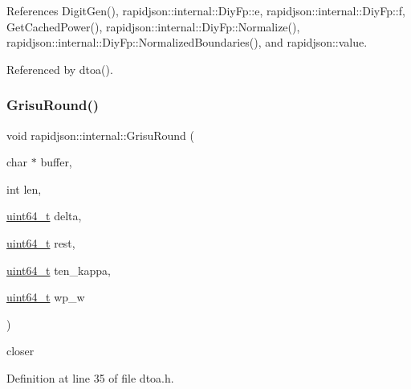 References Digit\+Gen(), rapidjson\+::internal\+::\+Diy\+Fp\+::e, rapidjson\+::internal\+::\+Diy\+Fp\+::f, Get\+Cached\+Power(), rapidjson\+::internal\+::\+Diy\+Fp\+::\+Normalize(), rapidjson\+::internal\+::\+Diy\+Fp\+::\+Normalized\+Boundaries(), and rapidjson\+::value.



Referenced by dtoa().

\mbox{\label{namespacerapidjson_1_1internal_a7d7397686d2c8c57cf11d9afae17bb4d}} 
\subsubsection{\texorpdfstring{GrisuRound()}{GrisuRound()}}
{\footnotesize\ttfamily void rapidjson\+::internal\+::\+Grisu\+Round (\begin{DoxyParamCaption}\item[{char $\ast$}]{buffer,  }\item[{int}]{len,  }\item[{\mbox{\hyperlink{stdint_8h_aec6fcb673ff035718c238c8c9d544c47}{uint64\+\_\+t}}}]{delta,  }\item[{\mbox{\hyperlink{stdint_8h_aec6fcb673ff035718c238c8c9d544c47}{uint64\+\_\+t}}}]{rest,  }\item[{\mbox{\hyperlink{stdint_8h_aec6fcb673ff035718c238c8c9d544c47}{uint64\+\_\+t}}}]{ten\+\_\+kappa,  }\item[{\mbox{\hyperlink{stdint_8h_aec6fcb673ff035718c238c8c9d544c47}{uint64\+\_\+t}}}]{wp\+\_\+w }\end{DoxyParamCaption})}

closer 

Definition at line 35 of file dtoa.\+h.


\begin{DoxyCode}{0}

\end{DoxyCode}


